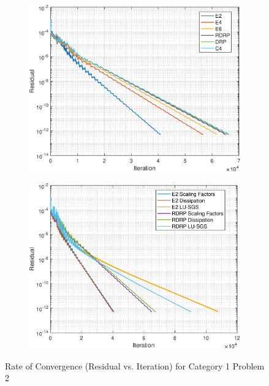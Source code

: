\documentclass[conf]{new-aiaa}
\begin{document}
\begin{figure}
\centering
\begin{subfigure}{0.5\textwidth}
  \centering
  \includegraphics[width=1.0\linewidth]{TriDi_Scaling_ROC_C1P2}
  \label{fig:Residual_Iteration_C1P2}
\end{subfigure}%
\begin{subfigure}{0.5\textwidth}
  \centering
  \includegraphics[width=1.0\linewidth]{C1P2_ROC_E2_vs_RDRP}
  \label{fig:C1P2_ROC_E2_vs_RDRP}
\end{subfigure}%
\caption{Rate of Convergence (Residual vs. Iteration) for Category 1 Problem 2}
\label{fig:C1P2_ROC}
\end{figure}
\end{document}
